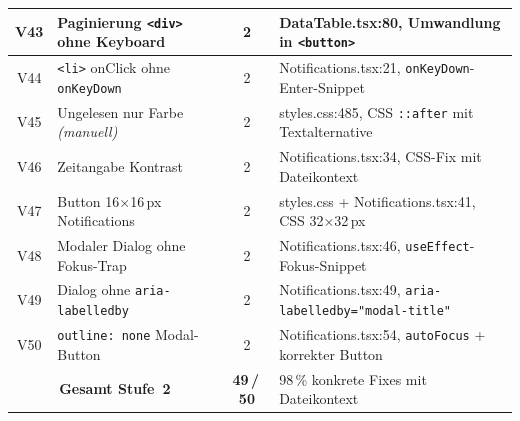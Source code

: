 \begin{longtable}{|c|p{5.2cm}|c|p{5.8cm}|}
\hline
V43 & Paginierung \texttt{<div>} ohne Keyboard     & 2 & DataTable.tsx:80, Umwandlung in \texttt{<button>} \\
\hline
V44 & \texttt{<li>} onClick ohne \texttt{onKeyDown}& 2 & Notifications.tsx:21, \texttt{onKeyDown}-Enter-Snippet \\
\hline
V45 & Ungelesen nur Farbe \textit{(manuell)}       & 2 & styles.css:485, CSS \texttt{::after} mit Textalternative \\
\hline
V46 & Zeitangabe Kontrast                          & 2 & Notifications.tsx:34, CSS-Fix mit Dateikontext \\
\hline
V47 & Button 16×16\,px Notifications              & 2 & styles.css + Notifications.tsx:41, CSS 32×32\,px \\
\hline
V48 & Modaler Dialog ohne Fokus-Trap               & 2 & Notifications.tsx:46, \texttt{useEffect}-Fokus-Snippet \\
\hline
V49 & Dialog ohne \texttt{aria-labelledby}         & 2 & Notifications.tsx:49, \texttt{aria-labelledby="modal-title"} \\
\hline
V50 & \texttt{outline: none} Modal-Button          & 2 & Notifications.tsx:54, \texttt{autoFocus} + korrekter Button \\
\hline
\multicolumn{2}{|c|}{\textbf{Gesamt Stufe~2}} & \textbf{49\,/\,50} & 98\,\% konkrete Fixes mit Dateikontext \\
\hline
\end{longtable}



\label{app:csv_export_50}

\begin{table}[htbp]
\centering
\setlength{\tabcolsep}{3.5pt}
\renewcommand{\arraystretch}{1.15}
\caption[Beispielzeilen aus dem CSV-Export (test-50)]{Repräsentative Beispielzeilen aus \texttt{results-50/benchmark/summary.csv} (test-50-Suite; jeweils Run~01 pro Modell). Spaltenschema analog zu Tabelle~\ref{tab:csv_schema}.}
%
\label{tab:csv_beispiel_50}
\end{table}

